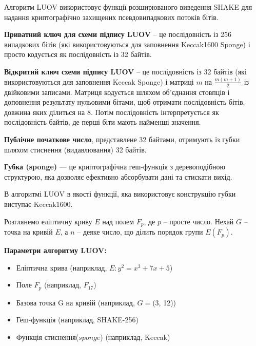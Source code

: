 Алгоритм LUOV використовує функції розширюваного виведення SHAKE для надання криптографічно захищених псевдовипадкових потоків бітів.

\textbf{Приватний ключ для схеми підпису LUOV} -- це послідовність із 256 випадкових бітів (які використовуються для заповнення Keccak1600 Sponge) і просто кодується як послідовність із 32 байтів.

\textbf{Відкритий ключ схеми підпису LUOV} -- це послідовність із 32 байтів (які використовуються для заповнення Keccak Sponge) і матриці $m$ на $\frac{m(m+1)}{2}$ із двійковими записами. Матриця кодується шляхом об’єднання стовпців і доповнення результату нульовими бітами, щоб отримати послідовність бітів, довжина яких ділиться на $8$. Потім послідовність інтерпретується як послідовність байтів, де перші біти мають найменші значення.

\textbf{Публічне початкове число}, представлене 32 байтами, отримують із губки шляхом стиснення (видавлювання) 32 байтів.

\textbf{Губка (sponge)} --- це криптографічна геш-функція з деревоподібною структурою, яка дозволяє ефективно абсорбувати дані та стискати вихід.

В алгоритмі LUOV в якості функції, яка використовує конструкцію губки виступає Keccak1600.

\vspace{0.5cm}
Розглянемо еліптичну криву $E$ над полем $F_p$, де $p$ -- просте число. Нехай $G$ -- точка на кривій $E$, а $n$ -- деяке число, що ділить порядок групи $E(F_p)$.

\vspace{0.25cm}
\textbf{Параметри алгоритму LUOV:}
\begin{itemize}
    \item Еліптична крива (наприклад, $E: y^2 = x^3 + 7x + 5$)
    \item Поле $F_p$ (наприклад, $F_{17}$)
    \item Базова точка G на кривій (наприклад, $G=$(3, 12))
    \item Геш-функція (наприклад, SHAKE-256)
    \item Функція стиснення($sponge$) (наприклад, Keccak) 
\end{itemize}

